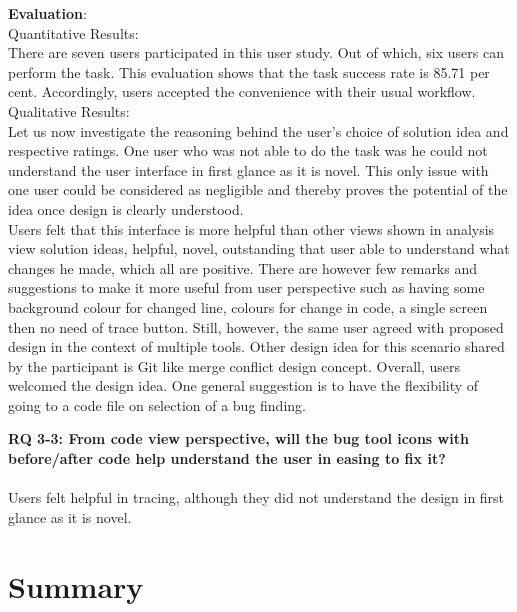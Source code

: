 \textbf{Evaluation}: \\

Quantitative Results: \\

There are seven users participated in this user study. Out of which, six users can perform the task. This evaluation shows that the task success rate is 85.71 per cent. Accordingly, users accepted the convenience with their usual workflow. \\

Qualitative Results: \\

Let us now investigate the reasoning behind the user’s choice of solution idea and respective ratings.  One user who was not able to do the task was he could not understand the user interface in first glance as it is novel. This only issue with one user could be considered as negligible and thereby proves the potential of the idea once design is clearly understood. \\

Users felt that this interface is more helpful than other views shown in analysis view solution ideas, helpful, novel, outstanding that user able to understand what changes he made, which all are positive. There are however few remarks and suggestions to make it more useful from user perspective such as having some background colour for changed line, colours for change in code, a single screen then no need of trace button. Still, however, the same user agreed with proposed design in the context of multiple tools. Other design idea for this scenario shared by the participant is Git like merge conflict design concept. Overall, users welcomed the design idea. One general suggestion is to have the flexibility of going to a code file on selection of a bug finding. \\


\begin{myboxi}{{\textbf{RQ 3-3: From code view perspective, will the bug tool icons with before/after code help understand the user in easing to fix it?}}}
\\ \\ Users felt helpful in tracing, although they did not understand the design in first glance as it is novel.
\end{myboxi}


\section{Summary}

